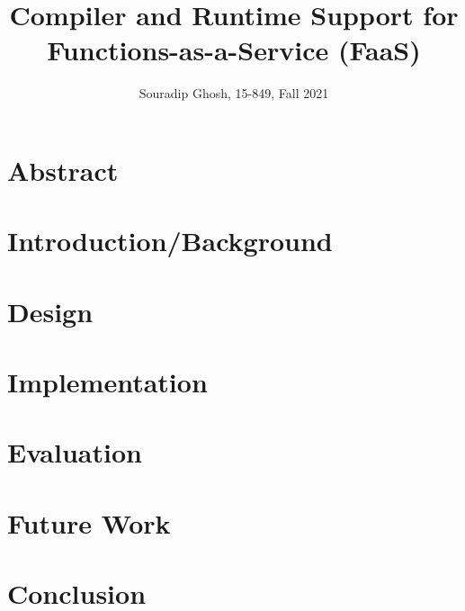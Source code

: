 \documentclass{article}
\title{Compiler and Runtime Support for Functions-as-a-Service (FaaS)}
\date{}
\author{Souradip Ghosh, 15-849, Fall 2021}
\begin{document}
\maketitle

\section{Abstract}

\section{Introduction/Background}

\section{Design}

\section{Implementation}

\section{Evaluation}

\section{Future Work}

\section{Conclusion}



\end{document}

